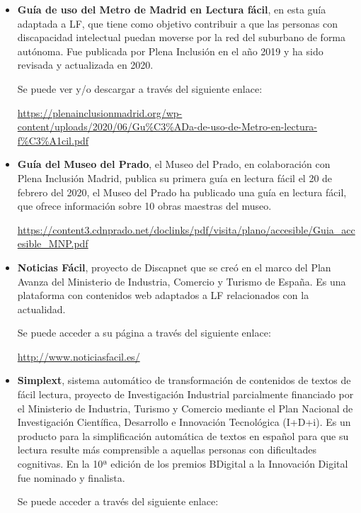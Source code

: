 \begin{itemize}
\item
{\textbf{Guía de uso del Metro de Madrid en Lectura fácil}}, en esta guía adaptada a LF, que tiene como objetivo contribuir a que las personas con discapacidad intelectual puedan moverse por la red del suburbano de forma autónoma. Fue publicada por Plena Inclusión en el año 2019 y ha sido revisada y actualizada en 2020. 

Se puede ver y/o descargar a través del siguiente enlace:


\href{https://plenainclusionmadrid.org/wp-content/uploads/2020/06/Gu\%C3\%ADa-de-uso-de-Metro-en-lectura-f\%C3\%A1cil.pdf}{https://plenainclusionmadrid.org/wp-content/uploads/2020/06/Gu\%C3\%ADa-de-uso-de-Metro-en-lectura-f\%C3\%A1cil.pdf}

\item
{\textbf{Guía del Museo del Prado}}, el Museo del Prado, en colaboración con Plena Inclusión Madrid, publica su primera guía en lectura fácil el 20 de febrero del 2020, el Museo del Prado ha publicado una guía en lectura fácil, que ofrece información sobre 10 obras maestras del museo.

\href{https://content3.cdnprado.net/doclinks/pdf/visita/plano/accesible/Guia\_accesible\_MNP.pdf}{https://content3.cdnprado.net/doclinks/pdf/visita/plano/accesible/Guia\_accesible\_MNP.pdf}


\item
{\textbf{Noticias Fácil}}, proyecto de Discapnet que se creó en el marco del Plan Avanza del Ministerio de Industria, Comercio y Turismo de España. Es una plataforma con contenidos web adaptados a LF relacionados con la actualidad. 

Se puede acceder a su página a través del siguiente enlace:

\href{http://www.noticiasfacil.es/}{http://www.noticiasfacil.es/}

\item
{\textbf{Simplext}}, sistema automático de transformación de contenidos de textos de fácil lectura, proyecto de Investigación Industrial parcialmente financiado por el Ministerio de Industria, Turismo y Comercio mediante el Plan Nacional de Investigación Científica, Desarrollo e Innovación Tecnológica (I+D+i). Es un producto para la simplificación automática de textos en español para que su lectura resulte más comprensible a aquellas personas con dificultades cognitivas. En la 10ª edición de los premios BDigital a la Innovación Digital fue nominado y finalista.

Se puede acceder a través del siguiente enlace:
 

\end{itemize}
